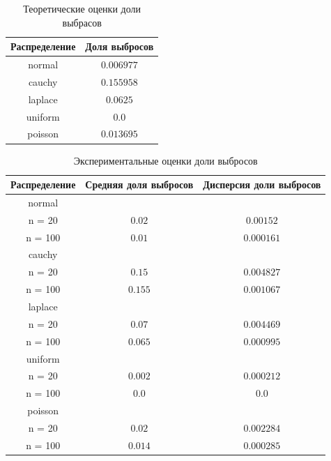 \documentclass[a4]{article}
\begin{document}
\begin{center}
\begin{table}[H]
		\caption{Теоретические оценки доли выбрасов}
		\label{tab:my_label}
		\begin{center}
			\vspace{5mm}
			\begin{tabular}{|c|c|}
				\hline
				Распределение & Доля выбросов\\
				\hline
				normal	& $0.006977$\\
				\hline
				cauchy & $0.155958$\\
				\hline
				laplace	& $0.0625$\\
				\hline
				uniform	& $0.0$\\
				\hline
				poisson	& $0.013695$\\
				\hline
			\end{tabular}
			
		\end{center}
		
	\end{table}
	
	\begin{table}[H]
		
		\caption{Экспериментальные оценки доли выбросов}
		\label{tab:my_label}
		\begin{center}
			\vspace{5mm}
			\begin{tabular}{|c|c|c|}
				\hline
				Распределение & Средняя доля выбросов & Дисперсия доли выбросов\\
				\hline
				normal	& &\\
				\hline
				n = 20   & 	$0.02$ &  $ 0.00152 $ \\
				\hline
				n = 100   &	$0.01$ & $ 0.000161 $   \\
				\hline
				cauchy	& &\\
				\hline
				n = 20   & 	$0.15$ & $ 0.004827 $   \\
				\hline
				n = 100  & 	$0.155$  & $ 0.001067 $  \\
				\hline
				laplace	& &\\
				\hline
				n = 20    &	$0.07$  & $ 0.004469 $  \\
				\hline
				n = 100   &	$0.065$ & $ 0.000995 $   \\
				\hline
				uniform	& &\\
				\hline
				n = 20    &	$0.002$ & $ 0.000212 $   \\
				\hline
				n = 100   &	$0.0$ & $ 0.0 $  \\ 
				\hline
				poisson	& &\\
				\hline
				n = 20   & 	$0.02$ & $ 0.002284 $   \\
				\hline
				n = 100  & 	$0.014$ & $ 0.000285 $   \\
				\hline
			\end{tabular}
			
		\end{center}
		
	\end{table}
	
\end{center}
\end{document}
